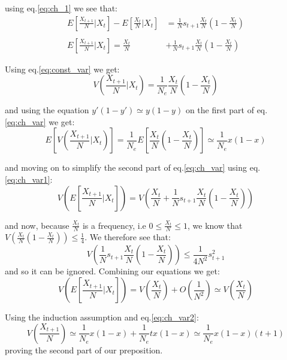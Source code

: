 \documentclass[11pt]{article}
\begin{document}
using eq.\ref{eq:ch_1} we see that:
\begin{equation}\label{eq:ch_var1}
\begin{split}
E\left[\frac{X_{t+1}}{N} \bigg|X_t \right] - E\left[\frac{X_{t}}{N} \bigg|X_t \right] &= \frac{1}{N}s_{t+1}\frac{X_t}{N}\left(1-\frac{X_t}{N} \right) \\\\
E\left[\frac{X_{t+1}}{N} \bigg|X_t \right] = \frac{X_t}{N} &+ \frac{1}{N}s_{t+1}\frac{X_t}{N}\left(1-\frac{X_t}{N} \right)
\end{split}
\end{equation}

Using eq.\ref{eq:const_var} we get:
\begin{equation}
V\left(\frac{X_{t+1}}{N} \bigg|X_t \right) = \frac{1}{N_e}\frac{X_t}{N}\left(1-\frac{X_t}{N} \right)
\end{equation}

and using the equation $y'(1-y') \simeq y(1-y)$ on the first part of eq.\ref{eq:ch_var} we get:
\begin{equation}\label{eq:ch_var2}
E\left[V\left(\frac{X_{t+1}}{N} \bigg|X_t \right)\right] = \frac{1}{N_e}E\left[\frac{X_t}{N}\left(1- \frac{X_t}{N}\right) \right] \simeq \frac{1}{N_e} x(1-x)
\end{equation}

and moving on to simplify the second part of eq.\ref{eq:ch_var} using eq.\ref{eq:ch_var1}:
\begin{equation}
V\left(E\left[\frac{X_{t+1}}{N} \bigg|X_t \right]\right) = V\left(\frac{X_t}{N} + \frac{1}{N}s_{t+1}\frac{X_t}{N}\left(1-\frac{X_t}{N} \right) \right)
\end{equation}

and now, because $\frac{X_t}{N}$ is a frequency, i.e $0\leq\frac{X_t}{N}\leq1$, we know that $V\left(\frac{X_t}{N}\left(1-\frac{X_t}{N} \right) \right)\leq\frac{1}{4}$. We therefore see that:
\begin{equation}
V\left(\frac{1}{N}s_{t+1}\frac{X_t}{N}\left(1-\frac{X_t}{N} \right) \right)\leq \frac{1}{4N^2}s^2_{t+1}
\end{equation}
and so it can be ignored.
Combining our equations we get:
\begin{equation}
V\left(E\left[\frac{X_{t+1}}{N} \bigg|X_t \right]\right) = V\left(\frac{X_t}{N}\right) + O\left(\frac{1}{N^2}\right)\simeq V\left(\frac{X_t}{N}\right)
\end{equation}

Using the induction assumption and eq.\ref{eq:ch_var2}:
\begin{equation}
V\left(\frac{X_{t+1}}{N}\right) \simeq \frac{1}{N_e}x(1-x) + \frac{1}{N_e}tx(1-x) \simeq \frac{1}{N_e}x(1-x)(t+1)
\end{equation}
proving the second part of our preposition.
\end{document}
